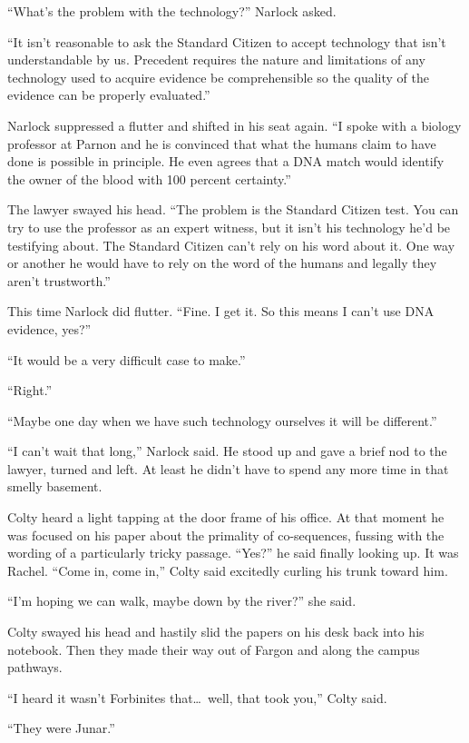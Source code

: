 ``What's the problem with the technology?'' Narlock asked.

``It isn't reasonable to ask the Standard Citizen to accept technology that isn't understandable
by us. Precedent requires the nature and limitations of any technology used to acquire evidence
be comprehensible so the quality of the evidence can be properly evaluated.''

Narlock suppressed a flutter and shifted in his seat again. ``I spoke with a biology professor
at Parnon and he is convinced that what the humans claim to have done is possible in principle.
He even agrees that a DNA match would identify the owner of the blood with 100 percent
certainty.''

The lawyer swayed his head. ``The problem is the Standard Citizen test. You can try to use the
professor as an expert witness, but it isn't his technology he'd be testifying about. The
Standard Citizen can't rely on his word about it. One way or another he would have to rely on
the word of the humans and legally they aren't trustworth.''

This time Narlock did flutter. ``Fine. I get it. So this means I can't use DNA evidence, yes?''

``It would be a very difficult case to make.''

``Right.''

``Maybe one day when we have such technology ourselves it will be different.''

``I can't wait that long,'' Narlock said. He stood up and gave a brief nod to the lawyer, turned
and left. At least he didn't have to spend any more time in that smelly basement.

\spacebreak

Colty heard a light tapping at the door frame of his office. At that moment he was focused on
his paper about the primality of co-sequences, fussing with the wording of a particularly tricky
passage. ``Yes?'' he said finally looking up. It was Rachel. ``Come in, come in,'' Colty said
excitedly curling his trunk toward him.

``I'm hoping we can walk, maybe down by the river?'' she said.

Colty swayed his head and hastily slid the papers on his desk back into his notebook. Then they
made their way out of Fargon and along the campus pathways.

``I heard it wasn't Forbinites that\ldots\ well, that took you,'' Colty said.

``They were Junar.''

